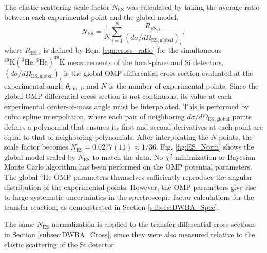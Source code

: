 The elastic scattering scale factor $N_{\mathrm{ES}}$ was calculated by taking the average ratio between each experimental point and the global model,
\begin{equation}
N_{\mathrm{ES}} = \frac{1}{N} \sum_{i=1}^{N} \frac{R_{\mathrm{ES}, i}}{\left( d\sigma/d\Omega_{\mathrm{ES, global}} \right)_{i}},
\end{equation}
where $R_{\mathrm{ES}, i}$ is defined by Eqn. \ref{eqn:cross_ratio} for the simultaneous $^{39}\mathrm{K}(^{3}\mathrm{He}, {}^{3}\mathrm{He})^{39}\mathrm{K}$ measurements of the focal-plane and Si detectors, $\left( d\sigma/d\Omega_{\mathrm{ES, global}} \right)_{i}$ is the global OMP differential cross section evaluated at the experimental angle $\theta_{\mathrm{c.m., i}}$, and $N$ is the number of experimental points. Since the global OMP differential cross section is not continuous, its value at each experimental center-of-mass angle must be interpolated. This is performed by cubic spline interpolation, where each pair of neighboring $d\sigma/d\Omega_{\mathrm{ES, global}}$ points defines a polynomial that ensures its first and second derivatives at each point are equal to that of neighboring polynomials. After interpolating the $N$ points, the scale factor becomes $N_{\mathrm{ES}} = 0.0277(11) \approx 1/36$. Fig. \ref{fig:ES_Norm} shows the global model scaled by $N_{\mathrm{ES}}$ to match the data. No $\chi^{2}$-minimization or Bayesian Monte Carlo algorithm has been performed on the OMP potential parameters. The global $^{3}$He OMP parameters themselves sufficiently reproduce the angular distribution of the experimental points. However, the OMP parameters give rise to large systematic uncertainties in the spectroscopic factor calculations for the transfer reaction, as demonstrated in Section \ref{subsec:DWBA_Spec}.

The same $N_{\mathrm{ES}}$ normalization is applied to the transfer differential cross sections in Section \ref{subsec:DWBA_Cross}, since they were also measured relative to the elastic scattering of the Si detector. %

